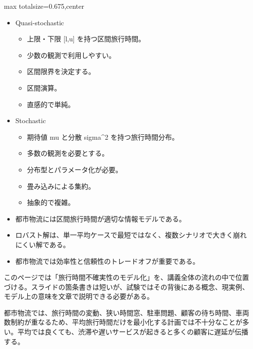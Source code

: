 \clearpage
{}
\begin{adjustbox}{max totalsize={\textwidth}{0.675\textheight},center}
\begin{minipage}{\textwidth}\scriptsize
\begin{minipage}[t]{0.485\textwidth}
\begin{itemize}
\item Quasi-stochastic
\begin{itemize}
\item 上限・下限 [l,u] を持つ区間旅行時間。
\item 少数の観測で利用しやすい。
\item 区間限界を決定する。
\item 区間演算。
\item 直感的で単純。
\end{itemize}
\item Stochastic
\begin{itemize}
\item 期待値 mu と分散 sigma\textasciicircum{}2 を持つ旅行時間分布。
\item 多数の観測を必要とする。
\item 分布型とパラメータ化が必要。
\item 畳み込みによる集約。
\item 抽象的で複雑。
\end{itemize}
\item 都市物流には区間旅行時間が適切な情報モデルである。
\end{itemize}
\begin{itemize}
\item ロバスト解は、単一平均ケースで最短ではなく、複数シナリオで大きく崩れにくい解である。
\item 都市物流では効率性と信頼性のトレードオフが重要である。
\end{itemize}
\end{minipage}\hfill
\begin{minipage}[t]{0.485\textwidth}
このページでは「旅行時間不確実性のモデル化」を、講義全体の流れの中で位置づける。スライドの箇条書きは短いが、試験ではその背後にある概念、現実例、モデル上の意味を文章で説明できる必要がある。\par
都市物流では、旅行時間の変動、狭い時間窓、駐車問題、顧客の待ち時間、車両数制約が重なるため、平均旅行時間だけを最小化する計画では不十分なことが多い。平均では良くても、渋滞や遅いサービスが起きると多くの顧客に遅延が伝播する。\par

\end{minipage}
\end{minipage}
\end{adjustbox}
